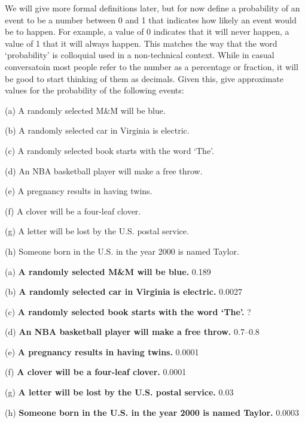 
We will give more formal definitions later, but for now
define a probability of an event to be a number between 0 and 1 that
indicates how likely an event would be to happen. For example, a
value of 0 indicates that it will never happen, a value of 1 that it
will always happen. This matches the way that the word `probability' is
colloquial used in a non-technical context. While in casual conversatoin
most people refer to the number as a percentage or fraction, it will
be good to start thinking of them as decimals. Given this, give approximate
values for the probability of the following events:

\begin{itemize}[\label={}]
  \tightlist
  \item {(a)} A randomly selected M\&M will be blue.
  \item {(b)} A randomly selected car in Virginia is electric.
  \item {(c)} A randomly selected book starts with the word `The'.
  \item {(d)} An NBA basketball player will make a free throw.
  \item {(e)} A pregnancy results in having twins.
  \item {(f)} A clover will be a four-leaf clover.
  \item {(g)} A letter will be lost by the U.S. postal service.
  \item {(h)} Someone born in the U.S. in the year 2000 is named Taylor.
\end{itemize}



\begin{itemize}[\label={}]
  \tightlist
  \item {(a)} \textbf{A randomly selected M\&M will be blue.} 0.189
  \item {(b)} \textbf{A randomly selected car in Virginia is electric.} 0.0027
  \item {(c)} \textbf{A randomly selected book starts with the word `The'.} ?
  \item {(d)} \textbf{An NBA basketball player will make a free throw.} 0.7--0.8
  \item {(e)} \textbf{A pregnancy results in having twins.} 0.0001
  \item {(f)} \textbf{A clover will be a four-leaf clover.} 0.0001
  \item {(g)} \textbf{A letter will be lost by the U.S. postal service.} 0.03
  \item {(h)} \textbf{Someone born in the U.S. in the year 2000 is named Taylor.} 0.0003
\end{itemize}
